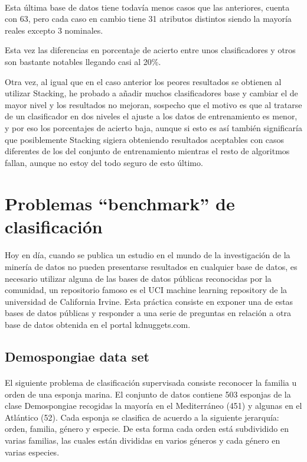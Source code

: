 \documentclass[es]{ifirak}
\begin{document}
\paragraph{}
Esta última base de datos tiene todavía menos casos que las anteriores, cuenta con 63, pero cada caso en cambio tiene 31 atributos distintos siendo la mayoría reales excepto 3 nominales.

Esta vez las diferencias en porcentaje de acierto entre unos clasificadores y otros son bastante notables llegando casi al 20\%.

Otra vez, al igual que en el caso anterior los peores resultados se obtienen al utilizar Stacking, he probado a añadir muchos clasificadores base y cambiar  el de mayor nivel y los resultados no mejoran, sospecho que el motivo es que al tratarse de un clasificador en dos niveles el ajuste a los datos de entrenamiento es menor, y por eso los porcentajes de acierto baja, aunque si esto es así también significaría que posiblemente Stacking sigiera obteniendo resultados aceptables con casos diferentes de los del conjunto de entrenamiento mientras el resto de algoritmos fallan, aunque no estoy del todo seguro de esto último.

\section{Problemas “benchmark” de clasificación}
\paragraph{}
Hoy en día, cuando se publica un estudio en el mundo de la investigación de la minería de datos no pueden presentarse resultados en cualquier base de datos, es necesario utilizar alguna de las bases de datos públicas reconocidas por la comunidad, un repositorio famoso es el UCI machine learning repository de la universidad de California Irvine. Esta práctica consiste en exponer una de estas bases de datos públicas y responder a una serie de preguntas en relación a otra base de datos obtenida en el portal kdnuggets.com.

\subsection{Demospongiae data set}
\paragraph{}
El siguiente problema de clasificación supervisada consiste reconocer la familia u orden de una esponja marina. El conjunto de datos contiene 503 esponjas de la clase Demospongiae recogidas la mayoría en el Mediterráneo (451) y algunas en el Atlántico (52). Cada esponja se clasifica de acuerdo a la siguiente jerarquía: orden, familia, género y especie. De esta forma cada orden está subdividido en varias familias, las cuales están divididas en varios géneros y cada género en varias especies. 
\end{document}

